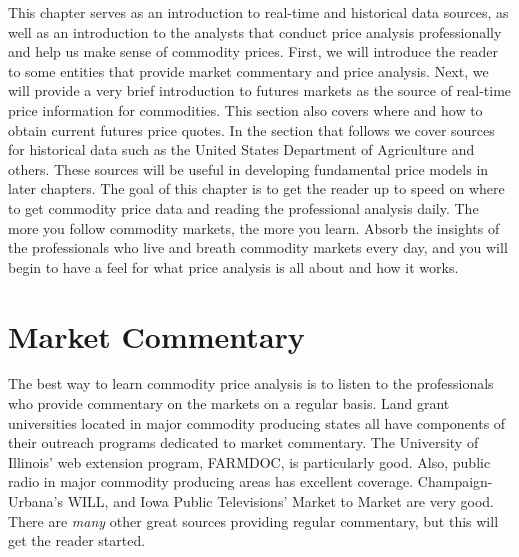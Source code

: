 \documentclass[
  letterpaper,
  DIV=11,
  numbers=noendperiod]{scrreprt}
\begin{document}
This chapter serves as an introduction to real-time and historical data
sources, as well as an introduction to the analysts that conduct price
analysis professionally and help us make sense of commodity prices.
First, we will introduce the reader to some entities that provide market
commentary and price analysis. Next, we will provide a very brief
introduction to futures markets as the source of real-time price
information for commodities. This section also covers where and how to
obtain current futures price quotes. In the section that follows we
cover sources for historical data such as the United States Department
of Agriculture and others. These sources will be useful in developing
fundamental price models in later chapters. The goal of this chapter is
to get the reader up to speed on where to get commodity price data and
reading the professional analysis daily. The more you follow commodity
markets, the more you learn. Absorb the insights of the professionals
who live and breath commodity markets every day, and you will begin to
have a feel for what price analysis is all about and how it works.

\section{Market Commentary}\label{market-commentary}

The best way to learn commodity price analysis is to listen to the
professionals who provide commentary on the markets on a regular basis.
Land grant universities located in major commodity producing states all
have components of their outreach programs dedicated to market
commentary. The University of Illinois' web extension program, FARMDOC,
is particularly good. Also, public radio in major commodity producing
areas has excellent coverage. Champaign-Urbana's WILL, and Iowa Public
Televisions' Market to Market are very good. There are \emph{many} other
great sources providing regular commentary, but this will get the reader
started.
\end{document}
